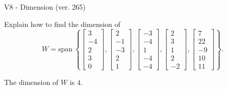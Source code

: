 \begin{exercise}
  \begin{exerciseTitle}V8 - Dimension (ver. 265)\end{exerciseTitle}
  \begin{exerciseStatement}
    Explain how to find the dimension of 
\[W=\mathrm{span}\ \left\{\left[\begin{array}{r}
3 \\
-4 \\
2 \\
3 \\
0
\end{array}\right] , \left[\begin{array}{r}
2 \\
-1 \\
-3 \\
2 \\
1
\end{array}\right] , \left[\begin{array}{r}
-3 \\
-4 \\
1 \\
-4 \\
-4
\end{array}\right] , \left[\begin{array}{r}
2 \\
3 \\
1 \\
2 \\
-2
\end{array}\right] , \left[\begin{array}{r}
7 \\
22 \\
-9 \\
10 \\
11
\end{array}\right]\right\}.\]



  \end{exerciseStatement}
  \begin{exerciseAnswer}
   The dimension of \(W\) is  \(4\).
  


  \end{exerciseAnswer}
\end{exercise}